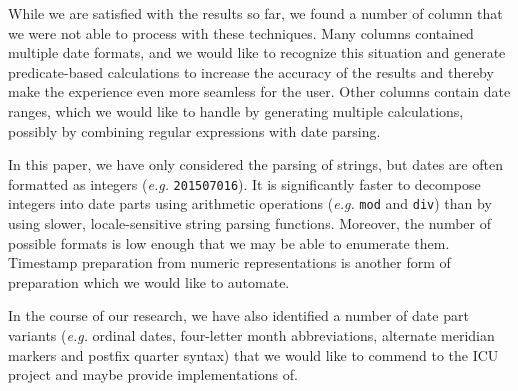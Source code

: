 While we are satisfied with the results so far, we found a number of column that we were not able to process with these techniques. Many columns contained multiple date formats, and we would like to recognize this situation and generate predicate-based calculations to increase the accuracy of the results and thereby make the experience even more seamless for the user. Other columns contain date ranges, which we would like to handle by generating multiple calculations, possibly by combining regular expressions with date parsing.

In this paper, we have only considered the parsing of strings, but dates are often formatted as integers (\textit{e.g.} \texttt{201507016}). It is significantly faster to decompose integers into date parts using arithmetic operations (\textit{e.g.} \texttt{mod} and \texttt{div}) than by using slower, locale-sensitive string parsing functions. Moreover, the number of possible formats is low enough that we may be able to enumerate them. Timestamp preparation from numeric representations is another form of preparation which we would like to automate.

In the course of our research, we have also identified a number of date part variants (\textit{e.g.} ordinal dates, four-letter month abbreviations, alternate meridian markers and postfix quarter syntax) that we would like to commend to the ICU project and maybe provide implementations of.
